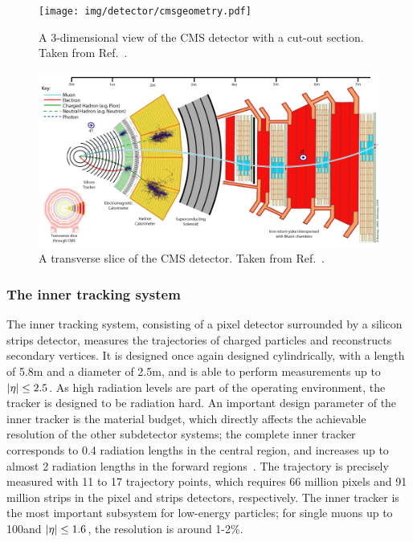 \begin{figure}[hbtp]
  \begin{center}
    \texttt{[image: img/detector/cmsgeometry.pdf]}
    \caption{
        A 3-dimensional view of the CMS detector with a cut-out section.
        Taken from Ref.~\cite{Sakuma:2013jqa}.
        }
    \label{fig:cmsgeometry}
  \end{center}
\end{figure}


\begin{figure}[hbtp]
  \begin{center}
    \includegraphics[width=\linewidth]{img/detector/cmsslice.png}
    \caption{
        A transverse slice of the CMS detector.
        Taken from Ref.~\cite{cmsslice}.
        }
    \label{fig:cmsslice}
  \end{center}
\end{figure}


\subsubsection{The inner tracking system}

The inner tracking system, consisting of a pixel detector surrounded by a silicon strips detector, measures the trajectories of charged particles and reconstructs secondary vertices.
% 
It is designed once again designed cylindrically, with a length of 5.8\unit{m} and a diameter of 2.5\unit{m}, and is able to perform measurements up to $\left| \eta \right | \leq 2.5$.
% 
As high radiation levels are part of the operating environment, the tracker is designed to be radiation hard.
%
An important design parameter of the inner tracker is the material budget, which directly affects the achievable resolution of the other subdetector systems; the complete inner tracker corresponds to 0.4 radiation lengths in the central region, and increases up to almost 2 radiation lengths in the forward regions~\cite{Chatrchyan:2008zzk}.
% 
The trajectory is precisely measured with 11 to 17 trajectory points, which requires 66 million pixels and 91 million strips in the pixel and strips detectors, respectively.
% 
The inner tracker is the most important subsystem for low-energy particles; for single muons up to 100\GeV and $\left| \eta \right | \leq 1.6$, the \pt resolution is around 1-2\%.


